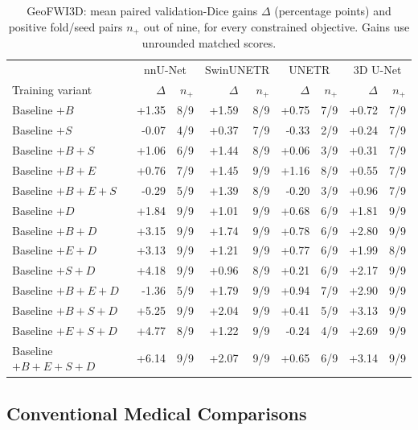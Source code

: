 \documentclass[12pt,a4paper]{article}
\begin{document}
\begin{table}[htbp]
\centering\small{}
\setlength{\tabcolsep}{4pt}
\renewcommand{\arraystretch}{1.12}
\begin{tabular}{@{}l*{4}{rr}@{}}
\hline
 & \multicolumn{2}{c}{nnU-Net} & \multicolumn{2}{c}{SwinUNETR} & \multicolumn{2}{c}{UNETR} & \multicolumn{2}{c}{3D U-Net} \\
Training variant & $\Delta$ & $n_+$ & $\Delta$ & $n_+$ & $\Delta$ & $n_+$ & $\Delta$ & $n_+$ \\
\hline
Baseline $+B$ & +1.35 & 8/9 & +1.59 & 8/9 & +0.75 & 7/9 & +0.72 & 7/9 \\
Baseline $+S$ & -0.07 & 4/9 & +0.37 & 7/9 & -0.33 & 2/9 & +0.24 & 7/9 \\
Baseline $+B+S$ & +1.06 & 6/9 & +1.44 & 8/9 & +0.06 & 3/9 & +0.31 & 7/9 \\
Baseline $+B+E$ & +0.76 & 7/9 & +1.45 & 9/9 & +1.16 & 8/9 & +0.55 & 7/9 \\
Baseline $+B+E+S$ & -0.29 & 5/9 & +1.39 & 8/9 & -0.20 & 3/9 & +0.96 & 7/9 \\
Baseline $+D$ & +1.84 & 9/9 & +1.01 & 9/9 & +0.68 & 6/9 & +1.81 & 9/9 \\
Baseline $+B+D$ & +3.15 & 9/9 & +1.74 & 9/9 & +0.78 & 6/9 & +2.80 & 9/9 \\
Baseline $+E+D$ & +3.13 & 9/9 & +1.21 & 9/9 & +0.77 & 6/9 & +1.99 & 8/9 \\
Baseline $+S+D$ & +4.18 & 9/9 & +0.96 & 8/9 & +0.21 & 6/9 & +2.17 & 9/9 \\
Baseline $+B+E+D$ & -1.36 & 5/9 & +1.79 & 9/9 & +0.94 & 7/9 & +2.90 & 9/9 \\
Baseline $+B+S+D$ & +5.25 & 9/9 & +2.04 & 9/9 & +0.41 & 5/9 & +3.13 & 9/9 \\
Baseline $+E+S+D$ & +4.77 & 8/9 & +1.22 & 9/9 & -0.24 & 4/9 & +2.69 & 9/9 \\
Baseline $+B+E+S+D$ & +6.14 & 9/9 & +2.07 & 9/9 & +0.65 & 6/9 & +3.14 & 9/9 \\
\hline
\end{tabular}
\caption{GeoFWI3D: mean paired validation-Dice gains $\Delta$
(percentage points) and positive fold/seed pairs $n_+$ out of nine,
for every constrained objective. Gains use unrounded matched scores.}
\label{tab:geo-ledger}
\end{table}

\FloatBarrier
\subsection{Conventional Medical Comparisons}
\end{document}
